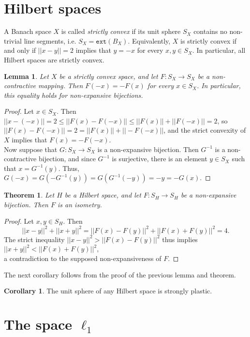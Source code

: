 \documentclass[reqno]{amsart}
\theoremstyle{plain}
\newtheorem{theorem}{Theorem}[section]
\newtheorem{lemma}{Lemma}[section]
\theoremstyle{remark}
\theoremstyle{definition}
\newtheorem{corollary}{Corollary}[section]
\begin{document}
\section{Hilbert spaces}\label{HS}
A Banach space $X$ is called \textit{strictly convex} if its unit sphere $S_X$ contains no non-trivial line segments, i.e. $S_X=\mathtt{ext}(B_X)$. Equivalently, $X$ is strictly convex if and only if $||x-y||=2$ implies that $y=-x$ for every $x,y \in S_X$. In particular, all Hilbert spaces are strictly convex.
\begin{lemma}

Let $X$ be a strictly convex space, and let $F:S_X \rightarrow S_X$ be a non-contractive mapping. 
Then $F(-x)=-F(x)$ for every $x\in S_X$. In particular, this equality holds for non-expansive bijections.
\end{lemma}
\begin{proof}
    Let $x\in S_X$. Then $||x-(-x)||=2 \leq ||F(x)-F(-x)||\leq ||F(x)||+||F(-x)||=2$, so $||F(x)-F(-x)||=2=||F(x)||+||-F(-x)||$, and the strict convexity of $X$ implies that $F(x)=-F(-x)$.\\
    Now suppose that $G:S_X \rightarrow S_X$ is a non-expansive bijection. Then $G^{-1}$ is a non-contractive bijection, and since $G^{-1}$ is surjective, there is an element $y\in S_X$ such that $x=G^{-1}(y)$. Thus, $G(-x)=G(-G^{-1}(y))=G(G^{-1}(-y))=-y=-G(x)$.
\end{proof}

\begin{theorem}
    Let $H$ be a Hilbert space, and let $F:S_H\rightarrow S_H$ be a non-expansive bijection. Then $F$ is an isometry.
\end{theorem}
\begin{proof}
    Let $x,y \in S_H$. Then \[||x-y||^2 +||x+y||^2=||F(x)-F(y)||^2+||F(x)+F(y)||^2=4.\]
    The strict inequality $||x-y||^2>||F(x)-F(y)||^2$ thus implies $||x+y||^2 <||F(x)+F(y)||^2$,\\ a contradiction to the supposed non-expansiveness of $F$.
\end{proof}

 The next corollary follows from the proof of the previous lemma and theorem.
\begin{corollary}
  The unit sphere of any Hilbert space is strongly plastic.
\end{corollary}




\section{The space $\ell_1$}\label{l1}
\end{document}
